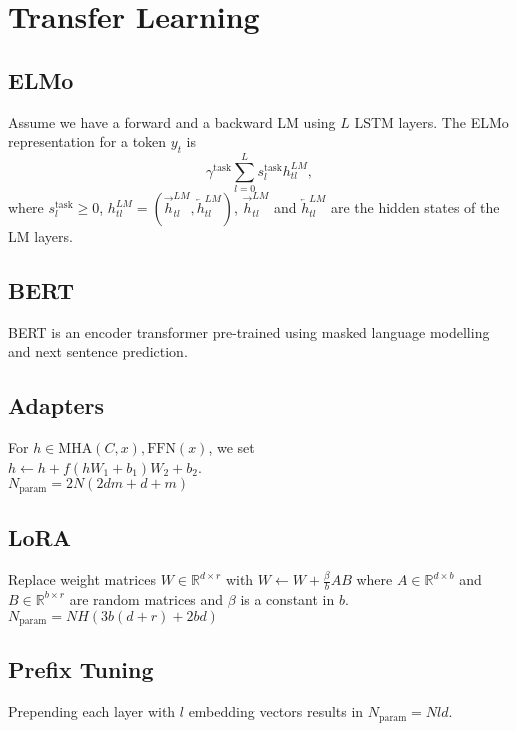 \section{Transfer Learning}
\subsection*{ELMo}
Assume we have a forward and a backward LM using $L$ LSTM layers. The ELMo representation for a token $y_t$ is $$\gamma^{\text{task}}\sum_{l=0}^{L} s_l^{\text{task}}h_{tl}^{LM},$$ where $s_l^{\text{task}}\geq0$, $h_{tl}^{LM}=(\overrightarrow{h}_{tl}^{LM}, \overleftarrow{h}_{tl}^{LM})$, $\overrightarrow{h}_{tl}^{LM}$ and $\overleftarrow{h}_{tl}^{LM}$ are the hidden states of the LM layers.

\subsection*{BERT}
BERT is an encoder transformer pre-trained using masked language modelling and next sentence prediction.

\subsection*{Adapters}
For $h \in {\text{MHA}(C, x), \text{FFN}(x)}$, we set\\
$h \leftarrow h + f (hW_1 + b_1 )W_2 + b_2$.\\
$N_{\text{param}}=2N(2dm+d+m)$

\subsection*{LoRA}
Replace weight matrices $W\in\mathbb{R}^{d\times r}$ with $W\leftarrow W +\frac{\beta}{b}AB$ where $A\in\mathbb{R}^{d\times b}$ and $B\in\mathbb{R}^{b\times r}$ are random matrices and $\beta$ is a constant in $b$.\\
$N_{\text{param}}=N H(3b(d+r) + 2bd)$

\subsection*{Prefix Tuning}
Prepending each layer with $l$ embedding vectors results in $N_{\text{param}}=Nld$.